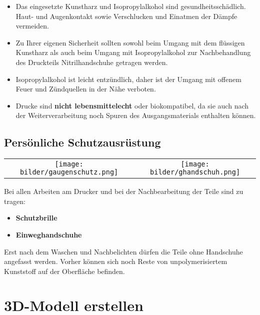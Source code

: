 \documentclass{\basedir/fablab-document}
\begin{document}
\begin{itemize}
    \item Das eingesetzte Kunstharz und Isopropylalkohol sind gesundheitsschädlich. Haut- und Augenkontakt sowie Verschlucken und Einatmen der Dämpfe vermeiden.
    \item Zu Ihrer eigenen Sicherheit sollten sowohl beim Umgang mit dem flüssigen Kunstharz als auch beim Umgang mit Isopropylalkohol zur Nachbehandlung des Druckteils Nitrilhandschuhe getragen werden.
    \item Isopropylalkohol ist leicht entzündlich, daher ist der Umgang mit offenem Feuer und Zündquellen in der Nähe verboten.
    \item Drucke sind \textbf{nicht lebensmittelecht} oder biokompatibel, da sie auch nach der Weiterverarbeitung noch Spuren des Ausgangsmaterials enthalten können. 
\end{itemize}


\subsection{Persönliche Schutzausrüstung}

\begin{table}[h]
    \centering
    \begin{tabular}{cc}

        \texttt{[image: bilder/gaugenschutz.png]}  & \texttt{[image: bilder/ghandschuh.png]} \\
    \end{tabular}
\end{table}

Bei allen Arbeiten am Drucker und bei der Nachbearbeitung der Teile sind zu tragen:
\begin{itemize}
    \item \textbf{Schutzbrille}
    \item \textbf{Einweghandschuhe}
\end{itemize}
Erst nach dem Waschen und Nachbelichten dürfen die Teile ohne Handschuhe angefasst werden. Vorher können sich noch Reste von unpolymerisiertem Kunststoff auf der Oberfläche befinden.
\newpage


\section{3D-Modell erstellen}
\end{document}
